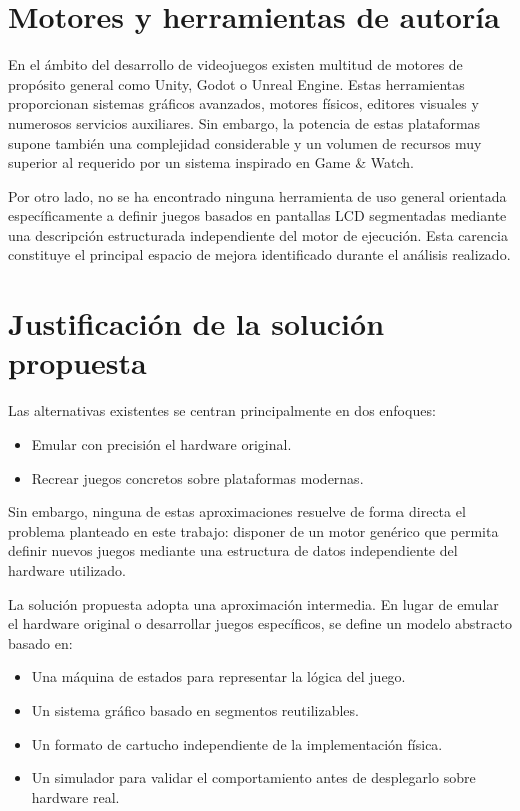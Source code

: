 \documentclass[../main.tex]{subfiles}
\begin{document}
	\section{Motores y herramientas de autoría}
	En el ámbito del desarrollo de videojuegos existen multitud de motores de propósito general como Unity, Godot o Unreal Engine. Estas herramientas proporcionan sistemas gráficos avanzados, motores físicos, editores visuales y numerosos servicios auxiliares. Sin embargo, la potencia de estas plataformas supone también una complejidad considerable y un volumen de recursos muy superior al requerido por un sistema inspirado en Game \& Watch.

	Por otro lado, no se ha encontrado ninguna herramienta de uso general orientada específicamente a definir juegos basados en pantallas LCD segmentadas mediante una descripción estructurada independiente del motor de ejecución. Esta carencia constituye el principal espacio de mejora identificado durante el análisis realizado.

	\section{Justificación de la solución propuesta}
	Las alternativas existentes se centran principalmente en dos enfoques:

	\begin{itemize}
		\item Emular con precisión el hardware original.
		\item Recrear juegos concretos sobre plataformas modernas.
	\end{itemize} Sin embargo, ninguna de estas aproximaciones resuelve de forma directa el problema planteado en este trabajo: disponer de un motor genérico que permita definir nuevos juegos mediante una estructura de datos independiente del hardware utilizado.

	La solución propuesta adopta una aproximación intermedia. En lugar de emular el hardware original o desarrollar juegos específicos, se define un modelo abstracto basado en:
	\begin{itemize}
		\item Una máquina de estados para representar la lógica del juego.
		\item Un sistema gráfico basado en segmentos reutilizables.
		\item Un formato de cartucho independiente de la implementación física.
		\item Un simulador para validar el comportamiento antes de desplegarlo sobre hardware real.
	\end{itemize}
\end{document}
